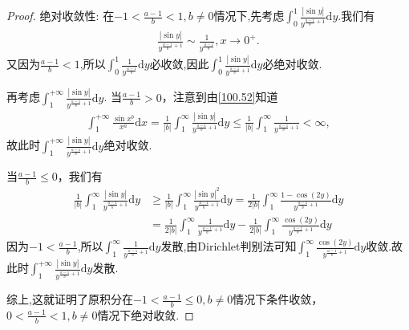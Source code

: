 \documentclass[../../main.tex]{subfiles}%
\begin{document}
\begin{proof}
{\heiti 绝对收敛性:} 在\(-1 < \frac{a - 1}{b} < 1, b\neq 0\)情况下,先考虑$\int_0^1{\frac{\left| \sin y \right|}{y^{\frac{a-1}{b}+1}}\mathrm{d}y}$.我们有
\begin{align*}
\frac{\left| \sin y \right|}{y^{\frac{a-1}{b}+1}}\sim \frac{1}{y^{\frac{a-1}{b}}},x\rightarrow 0^+.
\end{align*}
又因为$\frac{a-1}{b}<1$,所以$\int_0^1{\frac{1}{y^{\frac{a-1}{b}}}\mathrm{d}y}$必收敛,因此$\int_0^1{\frac{\left| \sin y \right|}{y^{\frac{a-1}{b}+1}}\mathrm{d}y}$必绝对收敛.

再考虑$\int_{1}^{+\infty}{\frac{\left| \sin y \right|}{y^{\frac{a-1}{b}+1}}\mathrm{d}y}$.
当\(\frac{a - 1}{b}>0\)，注意到由\eqref{100.52}知道
\begin{align*}
\int_{1}^{+\infty}\frac{\sin x^b}{x^a}\mathrm{d}x=\frac{1}{|b|}\int_{1}^{\infty}\frac{|\sin y|}{y^{\frac{a - 1}{b}+1}}\mathrm{d}y \leqslant \frac{1}{|b|}\int_{1}^{\infty}\frac{1}{y^{\frac{a - 1}{b}+1}} < \infty,
\end{align*}
故此时$\int_{1}^{+\infty}{\frac{\left| \sin y \right|}{y^{\frac{a-1}{b}+1}}\mathrm{d}y}$绝对收敛.

当\(\frac{a - 1}{b}\leqslant 0\)，我们有
\begin{align*}
\frac{1}{|b|}\int_{1}^{\infty}\frac{|\sin y|}{y^{\frac{a - 1}{b}+1}}\mathrm{d}y &\geqslant \frac{1}{|b|}\int_{1}^{\infty}\frac{|\sin y|^2}{y^{\frac{a - 1}{b}+1}}\mathrm{d}y = \frac{1}{2|b|}\int_{1}^{\infty}\frac{1 - \cos(2y)}{y^{\frac{a - 1}{b}+1}}\mathrm{d}y \\
&= \frac{1}{2|b|}\int_{1}^{\infty}\frac{1}{y^{\frac{a - 1}{b}+1}}\mathrm{d}y - \frac{1}{2|b|}\int_{1}^{\infty}\frac{\cos(2y)}{y^{\frac{a - 1}{b}+1}}\mathrm{d}y
\end{align*}
因为$-1<\frac{a-1}{b}$,所以$\int_{1}^{\infty}\frac{1}{y^{\frac{a - 1}{b}+1}}\mathrm{d}y$发散,由Dirichlet判别法可知$\int_{1}^{\infty}\frac{\cos(2y)}{y^{\frac{a - 1}{b}+1}}\mathrm{d}y$收敛.故此时$\int_{1}^{+\infty}{\frac{\left| \sin y \right|}{y^{\frac{a-1}{b}+1}}\mathrm{d}y}$发散.

综上,这就证明了原积分在\(-1 < \frac{a - 1}{b} \leqslant 0, b\neq 0\)情况下条件收敛，\(0 < \frac{a - 1}{b} < 1, b\neq 0\)情况下绝对收敛. 
\end{proof}
\end{document}
